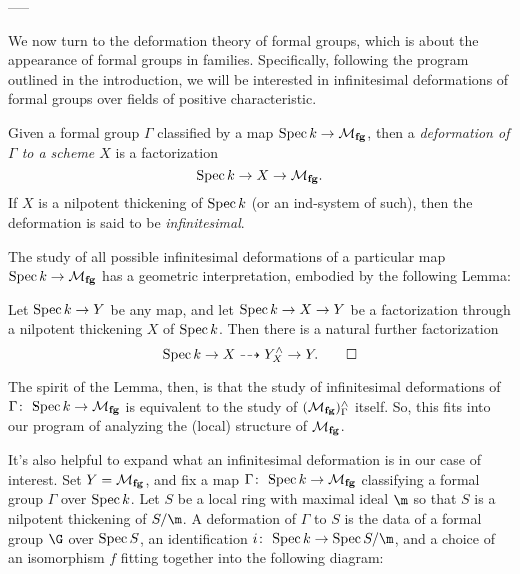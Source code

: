 -----




We now turn to the deformation theory of formal groups, which is about the appearance of formal groups in families.  Specifically, following the program outlined in the introduction, we will be interested in infinitesimal deformations of formal groups over fields of positive characteristic.

\begin{definition}
Given a formal group $\Gamma$ classified by a map $\operatorname{Spec} k \to \mathcal{M}_{\mathbf{fg}}$, then a \textit{deformation of $\Gamma$ to a scheme $X$} is a factorization \[\operatorname{Spec} k \to X \to \mathcal{M}_{\mathbf{fg}}.\]  If $X$ is a nilpotent thickening of $\operatorname{Spec} k$ (or an ind-system of such), then the deformation is said to be \textit{infinitesimal}.
\end{definition}

The study of all possible infinitesimal deformations of a particular map $\operatorname{Spec} k \to \mathcal{M}_{\mathbf{fg}}$ has a geometric interpretation, embodied by the following Lemma:

\begin{lemma}
Let $\operatorname{Spec} k \to Y$ be any map, and let $\operatorname{Spec} k \to X \to Y$ be a factorization through a nilpotent thickening $X$ of $\operatorname{Spec} k$.  Then there is a natural further factorization \[\operatorname{Spec} k \to X \dashrightarrow Y^\wedge_X \to Y. \qed\]
\end{lemma}

\noindent The spirit of the Lemma, then, is that the study of infinitesimal deformations of $\Gamma\colon\thinspace \operatorname{Spec} k \to \mathcal{M}_{\mathbf{fg}}$ is equivalent to the study of $(\mathcal{M}_{\mathbf{fg}})^\wedge_\Gamma$ itself.  So, this fits into our program of analyzing the (local) structure of $\mathcal{M}_{\mathbf{fg}}$.

\begin{example}
It's also helpful to expand what an infinitesimal deformation is in our case of interest.  Set $Y = \mathcal{M}_{\mathbf{fg}}$, and fix a map $\Gamma\colon\thinspace \operatorname{Spec} k \to \mathcal{M}_{\mathbf{fg}}$ classifying a formal group $\Gamma$ over $\operatorname{Spec} k$.  Let $S$ be a local ring with maximal ideal $\m$ so that $S$ is a nilpotent thickening of $S / \m$.  A deformation of $\Gamma$ to $S$ is the data of a formal group $\G$ over $\operatorname{Spec} S$, an identification $i\co \Spec k \to \Spec S/\m$, and a choice of an isomorphism $f$ fitting together into the following diagram:
\begin{center}
\end{center}
\end{example}

